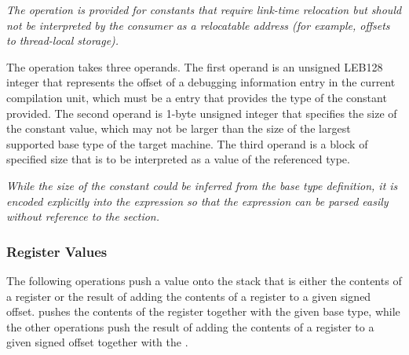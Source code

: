 \begin{enumerate}[1. ]
\textit{The \DWOPconstxNAME{} operation is provided for constants that
require link-time relocation but should not be
interpreted by the consumer as a relocatable address
(for example, offsets to thread-local storage).}

\itembfnl{\DWOPconsttypeTARG}
The \DWOPconsttypeNAME{} operation takes three operands. The first operand 
is an unsigned LEB128 integer that represents the offset of a debugging
information entry in the current compilation unit, which must be a
\DWTAGbasetype{} entry that provides the type of the constant provided. The
second operand is 1-byte unsigned integer that specifies the size of the
constant value, which may not be larger than the size of the largest supported
base type of the target machine. The third operand is a block of specified 
size that is to be interpreted as a value of the referenced type.

\textit{While the size of the constant could be inferred from the base type
definition, it is encoded explicitly into the expression so that the
expression can be parsed easily without reference to the \dotdebuginfo{}
section.}

\end{enumerate}

\subsubsection{Register Values}
\label{chap:registervalues}
The following operations push a value onto the stack that is either the
contents of a register or the result of adding the contents of a register
to a given signed offset. 
\DWOPregvaltype{} pushes the contents
of the register together with the given base type, while the other operations
push the result of adding the contents of a register to a given
signed offset together with the \specialaddresstype.

